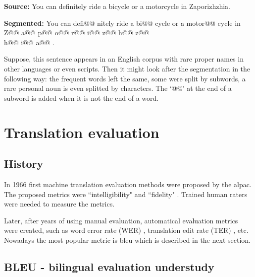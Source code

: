 \vspace{\baselineskip}
\begin{minipage}[t]{0.9\textwidth}

\textbf{Source:} You can definitely ride a bicycle or a motorcycle in
	Zaporizhzhia.

\textbf{Segmented:} You can defi@@ nitely ride a bi@@ cycle or a motor@@
	cycle in Z@@ a@@ p@@ o@@ r@@ i@@ z@@ h@@ z@@ \\
	h@@ i@@ a@@ .


	\begin{exmp}
	Suppose, this sentence appears in an English corpus with rare
	proper names in other languages or even scripts.
	Then it might look after the segmentation in the following way:
	the frequent words left the same, some were split
	by subwords, a rare personal noun is even splitted by characters.
	The `@@' at the end of a subword is added when it is not
	the end of a word.
	\label{exmp:bpe_segmentation}
	\end{exmp}

\end{minipage}
\vspace{\baselineskip}


\section{Translation evaluation}

\subsection{History}

In 1966 first machine translation evaluation methods were proposed
by the \acrfull{alpac}.
The proposed metrics were ``intelligibility" and ``fidelity"
\citep[p~67]{Translation1966}.
Trained human raters were needed to measure the metrics.

Later, after years of using manual evaluation, automatical evaluation
metrics were created, such as word error rate (WER) \cite{Su1992},
translation edit rate (TER) \cite{Snover2006}, etc.
Nowadays the most popular metric is \acrfull{bleu} which is described
in the next section.


\subsection{BLEU - bilingual evaluation understudy}


